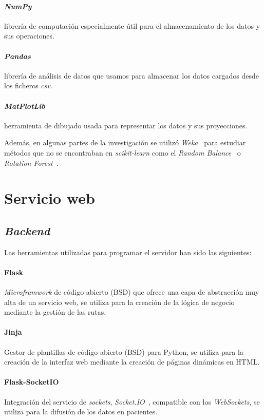 \paragraph{\textit{NumPy}~\cite{tool:numpy}}librería de computación especialmente útil para el almacenamiento de los datos y sus operaciones.
\paragraph{\textit{Pandas}~\cite{tool:pandas}}librería de análisis de datos que usamos para almacenar los datos cargados desde los ficheros \textit{csv}.
\paragraph{\textit{MatPlotLib}~\cite{tool:matplotlib}}herramienta de dibujado usada para representar los datos y sus proyecciones.

Además, en algunas partes de la investigación se utilizó \textit{Weka}~\cite{tool:weka} para estudiar métodos que no se encontraban en \textit{scikit-learn} como el \textit{Random Balance}~\cite{diez2015random} o \textit{Rotation Forest}~\cite{rodriguez2006rotation}.

\section{Servicio web}

\subsection{\textit{Backend}}

Las herramientas utilizadas para programar el servidor han sido las siguientes:
\paragraph{Flask~\cite{tool:flask}}\textit{Microframwork} de código abierto (BSD) que ofrece una capa de abstracción muy alta de un servicio web, se utiliza para la creación de la lógica de negocio mediante la gestión de las rutas.
\paragraph{Jinja~\cite{tool:jinja}}Gestor de plantillas de código abierto (BSD) para Python, se utiliza para la creación de la interfaz web mediante la creación de páginas dinámicas en HTML.
\paragraph{Flask-SocketIO~\cite{tool:flask-socketio}}Integración del servicio de \textit{sockets}, \textit{Socket.IO}~\cite{tool:socketio}, compatible con los \textit{WebSockets}, se utiliza para la difusión de los datos en pacientes.
